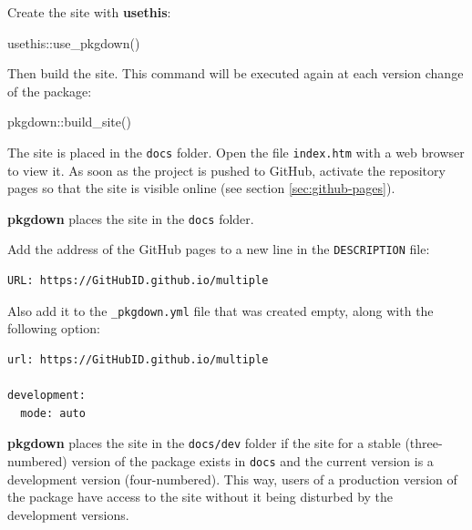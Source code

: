 \documentclass[
  12pt,
  american,
  a4paper,
  extrafontsizes,onecolumn,openright
  ]{memoir}
\newenvironment{Shaded}{\begin{snugshade}}{\end{snugshade}}
\newcommand{\FunctionTok}[1]{\textcolor[rgb]{0.00,0.00,0.00}{#1}}
\newcommand{\NormalTok}[1]{#1}
\newcommand{\SpecialCharTok}[1]{\textcolor[rgb]{0.00,0.00,0.00}{#1}}
\begin{document}
Create the site with \textbf{usethis}:

\scriptsize

\begin{Shaded}
\begin{Highlighting}[]
\NormalTok{usethis}\SpecialCharTok{::}\FunctionTok{use\_pkgdown}\NormalTok{()}
\end{Highlighting}
\end{Shaded}

\normalsize

Then build the site.
This command will be executed again at each version change of the package:

\scriptsize

\begin{Shaded}
\begin{Highlighting}[]
\NormalTok{pkgdown}\SpecialCharTok{::}\FunctionTok{build\_site}\NormalTok{()}
\end{Highlighting}
\end{Shaded}

\normalsize

The site is placed in the \texttt{docs} folder.
Open the file \texttt{index.htm} with a web browser to view it.
As soon as the project is pushed to GitHub, activate the repository pages so that the site is visible online (see section \ref{sec:github-pages}).

\textbf{pkgdown} places the site in the \texttt{docs} folder.

Add the address of the GitHub pages to a new line in the \texttt{DESCRIPTION} file:

\begin{verbatim}
URL: https://GitHubID.github.io/multiple
\end{verbatim}

Also add it to the \texttt{\_pkgdown.yml} file that was created empty, along with the following option:

\begin{verbatim}
url: https://GitHubID.github.io/multiple

development:
  mode: auto
\end{verbatim}

\textbf{pkgdown} places the site in the \texttt{docs/dev} folder if the site for a stable (three-numbered) version of the package exists in \texttt{docs} and the current version is a development version (four-numbered).
This way, users of a production version of the package have access to the site without it being disturbed by the development versions.
\end{document}
